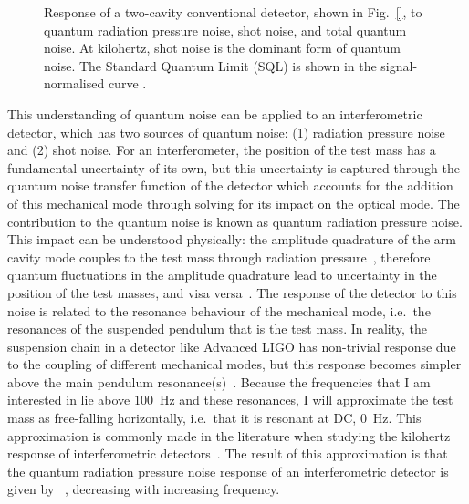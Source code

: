 \begin{figure}
	\centering
	\caption{Response of a two-cavity conventional detector, shown in Fig.~\ref{}, to quantum radiation pressure noise, shot noise, and total quantum noise. At kilohertz, shot noise is the dominant form of quantum noise. The Standard Quantum Limit (SQL) is shown in the signal-normalised curve .}
	\label{fig:simplifed_QN_response_conventional}
\end{figure}

This understanding of quantum noise can be applied to an interferometric detector, which has two sources of quantum noise: (1) radiation pressure noise and (2) shot noise. 
For an interferometer, the position of the test mass has a fundamental uncertainty of its own, but this uncertainty is captured through the quantum noise transfer function of the detector which accounts for the addition of this mechanical mode through solving for its impact on the optical mode. The contribution to the quantum noise is known as quantum radiation pressure noise. 
This impact can be understood physically: the amplitude quadrature of the arm cavity mode couples to the test mass through radiation pressure~\cite{}, therefore quantum fluctuations in the amplitude quadrature lead to uncertainty in the position of the test masses, and visa versa~\cite{Danilishin?}. The response of the detector to this noise is related to the resonance behaviour of the mechanical mode, i.e.\ the resonances of the suspended pendulum that is the test mass. In reality, the suspension chain in a detector like Advanced LIGO has non-trivial response due to the coupling of different mechanical modes, but this response becomes simpler above the main pendulum resonance(s)~\cite{}. Because the frequencies that I am interested in lie above $100$~Hz and these resonances, I will approximate the test mass as free-falling horizontally, i.e.\ that it is resonant at DC, $0$~Hz. This approximation is commonly made in the literature when studying the kilohertz response of interferometric detectors~\cite{}. The result of this approximation is that the quantum radiation pressure noise response of an interferometric detector is given by ~\cite{}, decreasing with increasing frequency.

